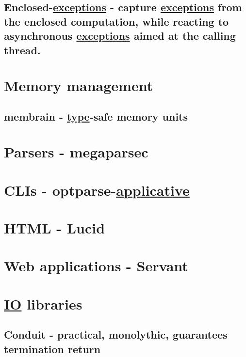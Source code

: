 \documentclass[a4paper,14pt,oneside]{book}
\begin{document}
{\section{Enclosed-\hyperref[orgb5f6f11]{exceptions} - capture \hyperref[orgb5f6f11]{exceptions} from the enclosed computation, while reacting to asynchronous \hyperref[orgb5f6f11]{exceptions} aimed at the calling thread.}
\label{sec:org55b3146}

\chapter{Memory management}
\label{sec:org3614417}

\section{membrain - \hyperref[orga9ca243]{type}-safe memory units}
\label{sec:orgc8546d7}

\chapter{Parsers - megaparsec}
\label{sec:org10e4246}

\chapter{CLIs - optparse-\hyperref[org812e4b8]{applicative}}
\label{sec:org06cf27c}

\chapter{HTML - Lucid}
\label{sec:org08be106}

\chapter{Web applications - Servant}
\label{sec:org68f3831}

\chapter{\hyperref[orgd908175]{IO} libraries}
\label{sec:org5625131}

\section{Conduit - practical, monolythic, guarantees termination return}
\label{sec:orgeb8ecf0}

}
\end{document}
